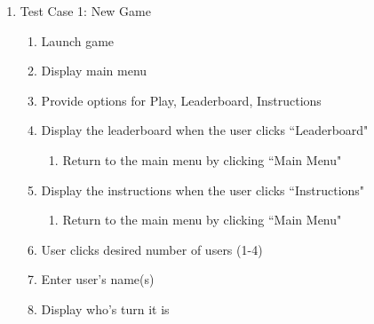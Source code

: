 \documentclass[]{report}   %
\begin{document}
	\begin{enumerate}
	\item Test Case 1: New Game
		\begin{enumerate}
		\item Launch game
		\item Display main menu
		\item Provide options for Play, Leaderboard, Instructions
		\item Display the leaderboard when the user clicks ``Leaderboard"
			\begin{enumerate}
			\item Return to the main menu by clicking ``Main Menu"
			\end{enumerate}
		\item Display the instructions when the user clicks ``Instructions"
			\begin{enumerate}
			\item Return to the main menu by clicking ``Main Menu"
			\end{enumerate}
		\item User clicks desired number of users (1-4)
		\item Enter user's name(s)
		\item Display who's turn it is
		\end{enumerate}
		
		\vspace{2.2in}
		

\end{enumerate}
\end{document}
